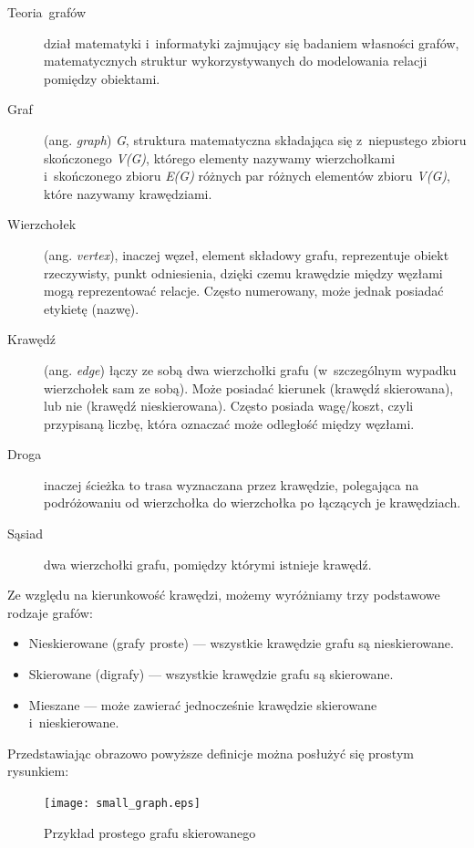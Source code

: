 \documentclass[a4paper,12pt,polish,oneside,openright]{thesis}
\begin{document}
\begin{description}
	\item[Teoria~grafów] dział matematyki i~informatyki zajmujący się badaniem własności grafów, matematycznych struktur wykorzystywanych do modelowania relacji pomiędzy obiektami.

	\item[Graf] (ang. \emph{graph}) \emph{G}, struktura matematyczna składająca się z~niepustego zbioru skończonego \emph{V(G)}, którego elementy nazywamy wierzchołkami i~skończonego zbioru \emph{E(G)} różnych par różnych elementów zbioru \emph{V(G)}, które nazywamy krawędziami.

	\item[Wierzchołek] (ang. \emph{vertex}), inaczej węzeł, element składowy grafu, reprezentuje obiekt rzeczywisty, punkt odniesienia, dzięki czemu krawędzie między węzłami mogą reprezentować relacje. Często numerowany, może jednak posiadać etykietę (nazwę).

	\item[Krawędź] (ang. \emph{edge}) łączy ze sobą dwa wierzchołki grafu (w~szczególnym wypadku wierzchołek sam ze sobą). Może posiadać kierunek (krawędź skierowana), lub nie (krawędź nieskierowana). Często posiada wagę/koszt, czyli przypisaną liczbę, która oznaczać może odległość między węzłami.

	\item[Droga] inaczej ścieżka to trasa wyznaczana przez krawędzie, polegająca na podróżowaniu od wierzchołka do wierzchołka po łączących je krawędziach.

	\item[Sąsiad] dwa wierzchołki grafu, pomiędzy którymi istnieje krawędź.
\end{description}

Ze względu na kierunkowość krawędzi, możemy wyróżniamy trzy podstawowe rodzaje grafów:
\begin{itemize}
	\item Nieskierowane (grafy proste) --- wszystkie krawędzie grafu są nieskierowane.
	\item Skierowane (digrafy) --- wszystkie krawędzie grafu są skierowane.
	\item Mieszane --- może zawierać jednocześnie krawędzie skierowane i~nieskierowane.
\end{itemize}

Przedstawiając obrazowo powyższe definicje można posłużyć się prostym rysunkiem:
\begin{figure}[htb]
	\begin{center}
		\texttt{[image: small\_graph.eps]}
		\caption{Przykład prostego grafu skierowanego}
		\label{fig:smallgraph}
	\end{center}
\end{figure}
\end{document}
